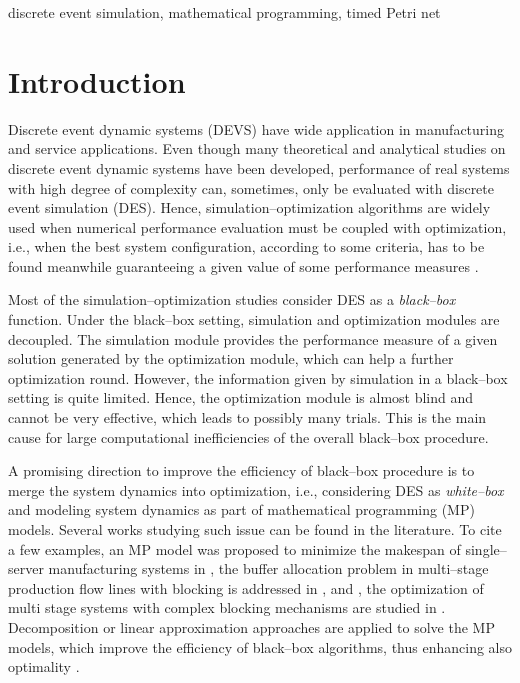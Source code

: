 \documentclass[suppldata]{interact}
\theoremstyle{plain}
\theoremstyle{definition}
\theoremstyle{remark}
\begin{document}
\begin{keywords}
discrete event simulation, mathematical programming, timed Petri net
\end{keywords}


\section{Introduction}

Discrete event dynamic systems (DEVS) have wide application in manufacturing and service applications. Even though many theoretical and analytical studies on discrete event dynamic systems have been developed, performance of real systems with high degree of complexity can, sometimes, only be evaluated with discrete event simulation (DES). Hence, simulation--optimization algorithms are widely used when numerical performance evaluation must be coupled with optimization, i.e., when the best system configuration, according to some criteria, has to be found meanwhile guaranteeing a given value of some performance measures \citep{fu20115book}.  

Most of the simulation--optimization studies consider DES as a \textit{black--box} function. Under the black--box setting, simulation and optimization modules are %
decoupled. The simulation module provides the performance measure of a given solution generated by the optimization module, which can help a further optimization round. However, the information given by simulation in a black--box setting is quite limited. Hence, the optimization module is almost blind and cannot be very effective, which leads to possibly many trials. This is the main cause for large computational inefficiencies of the overall black--box procedure.

A promising direction to improve the %
efficiency of black--box procedure is to merge the system dynamics into optimization, i.e., considering DES as \textit{white--box} and modeling system dynamics as part of mathematical programming (MP) models. Several works studying such issue can be found in the literature. To cite a few examples, an MP model was proposed to minimize the makespan of single--server manufacturing systems in \citep{di2020makespan}, the buffer allocation problem in multi--stage production flow lines with blocking is addressed in \citep{matta2008simulation}, \citep{weiss2015buffer} and \citep{alfieri2020time}, the optimization of multi stage systems with complex blocking mechanisms are studied in \citep{pedrielli2015integrated}. Decomposition or linear approximation approaches are applied to solve the MP models, %
which improve the efficiency of black--box algorithms, thus enhancing also optimality \citep{weiss2015buffer}\citep{alfieri2020time}. 
\end{document}
